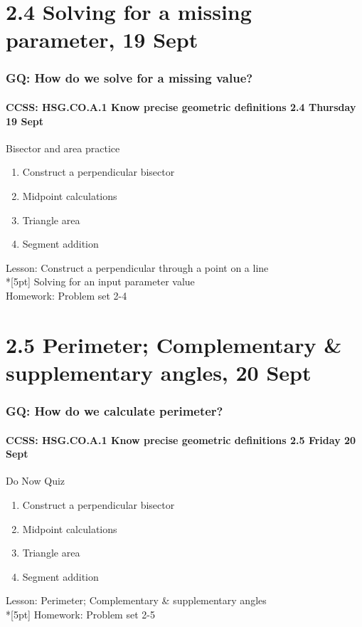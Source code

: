 \documentclass{beamer}
\begin{document}
    \section{2.4 Solving for a missing parameter, 19 Sept}
    \frame
    {
      \frametitle{GQ: How do we solve for a missing value?}
      \framesubtitle{CCSS: HSG.CO.A.1 Know precise geometric definitions \hfill \alert{2.4 Thursday 19 Sept}}
  
      \begin{block}{Bisector and area practice}
      \begin{enumerate}
        \item Construct a perpendicular bisector
        \item Midpoint calculations
        \item Triangle area
        \item Segment addition
      \end{enumerate}
      \end{block}
      Lesson: Construct a perpendicular through a point on a line \\*[5pt]
      Solving for an input parameter value\\ \smallskip
      Homework: Problem set 2-4 
    }

    \section{2.5 Perimeter; Complementary \& supplementary angles, 20 Sept}
    \frame
    {
      \frametitle{GQ: How do we calculate perimeter?}
      \framesubtitle{CCSS: HSG.CO.A.1 Know precise geometric definitions \hfill \alert{2.5 Friday 20 Sept}}
  
      \begin{block}{Do Now Quiz}
      \begin{enumerate}
        \item Construct a perpendicular bisector
        \item Midpoint calculations
        \item Triangle area
        \item Segment addition
      \end{enumerate}
      \end{block}
      Lesson: Perimeter; Complementary \& supplementary angles \\*[5pt]
      Homework: Problem set 2-5 
    }
\end{document}
